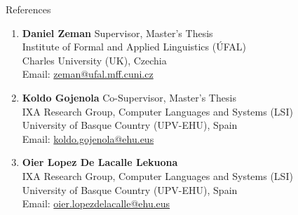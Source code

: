 \documentclass{resume}
\begin{document}
\begin{rSection}{References}

    \begin{enumerate}
        \item \textbf{Daniel Zeman} \hfill Supervisor, Master's Thesis\\
            Institute of Formal and Applied Linguistics ({\'U}FAL)\\
            Charles University (UK), Czechia\\
            Email: \href{mailto:zeman@ufal.mff.cuni.cz}{zeman@ufal.mff.cuni.cz}
        
        \item \textbf{Koldo Gojenola} \hfill Co-Supervisor, Master's Thesis\\
            IXA Research Group, Computer Languages and Systems (LSI)\\
            University of Basque Country (UPV-EHU), Spain\\
            Email: \href{mailto:koldo.gojenola@ehu.eus}{koldo.gojenola@ehu.eus}
        
        \item \textbf{Oier Lopez De Lacalle Lekuona}\\
            IXA Research Group, Computer Languages and Systems (LSI)\\
            University of Basque Country (UPV-EHU), Spain\\
            Email: \href{mailto:oier.lopezdelacalle@ehu.eus}{oier.lopezdelacalle@ehu.eus}
    \end{enumerate}

\end{rSection}
\end{document}
